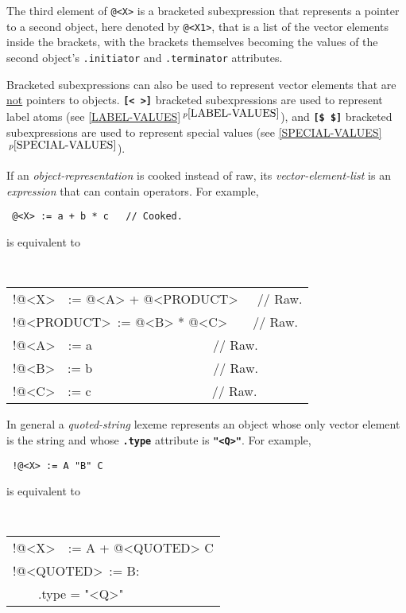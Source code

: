 \documentclass[12pt]{article}
\newcommand{\TT}[1]{{\tt \bfseries #1}}
\newcommand{\ttdkey}[1]{{\tt \bfseries .#1}}
\newcommand{\itemref}[1]{\ref{#1}$\,^{p\pageref{#1}}$}
\newenvironment{indpar}[1][0.3in]%
	{\begin{list}{}%
		     {\setlength{\itemsep}{0in}%
		      \setlength{\topsep}{0in}%
		      \setlength{\parsep}{1ex}%
		      \setlength{\labelwidth}{#1}%
		      \setlength{\leftmargin}{#1}%
		      \addtolength{\leftmargin}{\labelsep}}%
	 \item}%
	{\end{list}}
\begin{document}
The third element of {\tt @<X>} is a bracketed subexpression that
represents a pointer to a second object, here denoted by {\tt @<X1>},
that is a list of the vector elements inside the brackets, with the brackets
themselves becoming the values of the second object's {\tt .initiator}
and {\tt .terminator} attributes.

Bracketed subexpressions can also be used to represent vector elements
that are \underline{not} pointers to objects.  \TT{[<~>]}
bracketed subexpressions are used to represent
label atoms (see \itemref{LABEL-VALUES}),
and \TT{[\$~\$]} bracketed subexpressions are used to represent
special values (see \itemref{SPECIAL-VALUES}).

If an {\em object-representation} is cooked instead of raw,
its {\em vector-element-list} is an {\em expression} that can
contain operators.  For example,
\begin{indpar}
\begin{indpar}
\tt
@<X> := a + b * c~~~// Cooked.
\end{indpar}
is equivalent to
\begin{indpar}
\tt
\begin{tabular}{l}
!@<X>~~:= @<A> + @<PRODUCT>~~~// Raw. \\
!@<PRODUCT>~:= @<B> * @<C>~~~~// Raw. \\
!@<A>~~:= a~~~~~~~~~~~~~~~~~~~// Raw. \\
!@<B>~~:= b~~~~~~~~~~~~~~~~~~~// Raw. \\
!@<C>~~:= c~~~~~~~~~~~~~~~~~~~// Raw. \\
\end{tabular}
\end{indpar}
\end{indpar}

In general a {\em quoted-string} lexeme\label{QUOTE-BRACKETS}
represents an object
whose only vector element is the string and whose \ttdkey{type}
attribute is \TT{"<Q>"}.  For example,
\begin{indpar}
\begin{indpar}
\tt
!@<X> := A "B" C
\end{indpar}
is equivalent to
\begin{indpar}
\tt
\begin{tabular}{l}
!@<X>~~:= A + @<QUOTED> C \\
!@<QUOTED>~:= B: \\
~~~~.type = "<Q>" \\
\end{tabular}
\end{indpar}
\end{indpar}
\end{document}
